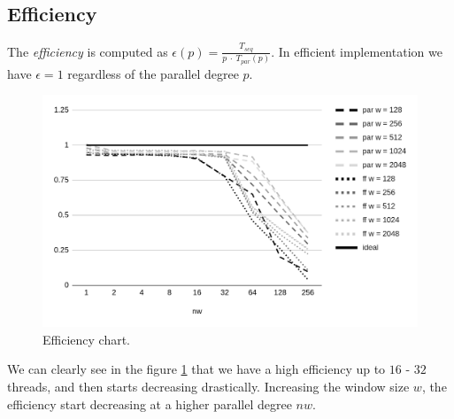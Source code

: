 \subsection{Efficiency}
The \textit{efficiency} is computed as $\epsilon(p) = \frac{T_{seq}}{p\ \cdot\ T_{par}(p)}$. In efficient implementation we have $\epsilon = 1$ regardless of the parallel degree $p$.

\begin{figure}[H]
    \centering
    \includegraphics[width=.75\linewidth]{assets/efficiency_ideal}
    \caption{Efficiency chart.}
    \label{fig:efficiency}
\end{figure}

\noindent
We can clearly see in the figure \ref{fig:efficiency} that we have a high efficiency up to $16$ - $32$ threads, and then starts decreasing drastically. Increasing the window size $w$, the efficiency start decreasing at a higher parallel degree $nw$.